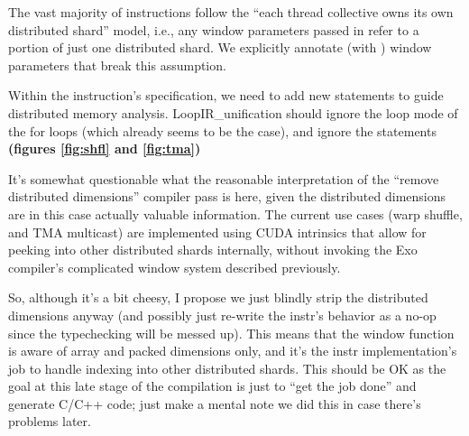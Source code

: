\filbreak
{}

The vast majority of instructions follow the ``each thread collective owns its own distributed shard'' model, i.e., any window parameters passed in refer to a portion of just one distributed shard.
We explicitly annotate (with ) window parameters that break this assumption.

\filbreak
Within the instruction's  specification, we need to add new  statements to guide distributed memory analysis.
LoopIR\_unification should ignore the loop mode of the for loops (which already seems to be the case), and ignore the  statements \textbf{(figures \ref{fig:shfl} and \ref{fig:tma})}

\begin{figure*}[!b]

\caption{Warp Shuffle Instr} \label{fig:shfl}
\end{figure*}

\filbreak
It's somewhat questionable what the reasonable interpretation of the ``remove distributed dimensions'' compiler pass is here, given the distributed dimensions are in this case actually valuable information.
The current use cases (warp shuffle, and TMA multicast) are implemented using CUDA intrinsics that allow for peeking into other distributed shards internally, without invoking the Exo compiler's complicated window system described previously.

\filbreak
So, although it's a bit cheesy, I propose we just blindly strip the distributed dimensions anyway (and possibly just re-write the instr's behavior as a no-op since the typechecking will be messed up).
This means that the window  function is aware of array and packed dimensions only, and it's the instr implementation's job to handle indexing into other distributed shards.
This should be OK as the goal at this late stage of the compilation is just to ``get the job done'' and generate C/C++ code;
just make a mental note we did this in case there's problems later.

\begin{figure*}[!b]

\caption{TMA Multicast Instr} \label{fig:tma}
\end{figure*}

\newpage
{}

